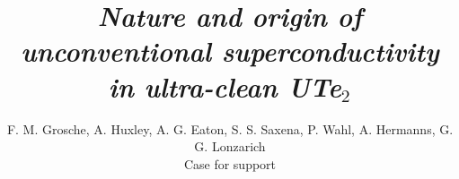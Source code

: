 \documentclass[twocolumn,prl,a4paper,tightenlines,10pt]{revtex4-2}
\begin{document}


\newcommand{\Figures}{/Users/fmg12/Documents/data/Figures}


\title {\textit{Nature and origin of unconventional superconductivity in ultra-clean UTe$_2$}} %

\author {F. M. Grosche, A. Huxley, A. G. Eaton, S. S. Saxena, P. Wahl, A. Hermanns, G. G. Lonzarich
\\ \vspace{0.2cm}
Case for support}

\begin{abstract}
\vspace{-0.8cm} 
\noindent 

\end{abstract}
\setlength{\columnsep}{2em}
\fontsize{10.9pt}{12.1pt}\selectfont
\maketitle
%

\setlength{\columnsep}{2em}

\vspace{-0.5em}


\clearpage
%
%

\end{document}
